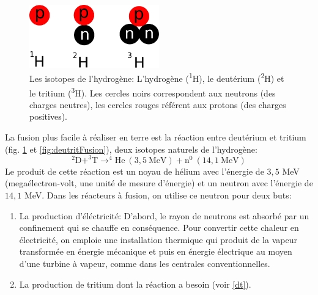 \documentclass[12pt,a4paper]{article}
\begin{document}
\begin{figure}[htb]
	\centering \includegraphics[width=0.5\textwidth]{images/IsotopesH}
	\caption{Les isotopes de l'hydrogène: L'hydrogène (\textsuperscript{1}H), le deutérium (\textsuperscript{2}H) et le tritium (\textsuperscript{3}H). Les cercles noirs correspondent aux neutrons (des charges neutres), les cercles rouges référent aux protons (des charges positives).}
	\label{fig:deutrit}
\end{figure}
La fusion plus facile à réaliser en terre est la réaction entre deutérium et tritium (fig. \ref{fig:deutrit} et \ref{fig:deutritFusion}), deux isotopes naturels de l'hydrogène:
\begin{equation}
^2 \text{D} + ^3 \text{T} \rightarrow ^4\text{He} ~( 3,5 ~\text{MeV} ) + \text{n}^0 ~( 14,1 ~\text{MeV} ) \label{eqn:DTfusion}
\end{equation}
Le produit de cette réaction est un noyau de hélium avec l'énergie de $3,5$ MeV (megaélectron-volt, une unité de mesure d'énergie) et un neutron avec l'énergie de $14,1$ MeV. Dans les réacteurs à fusion, on utilise ce neutron pour deux buts:
\begin{enumerate}
\item La production d'éléctricité: D'abord, le rayon de neutrons est absorbé par un confinement qui se chauffe en conséquence. Pour convertir cette chaleur en électricité, on emploie une installation thermique qui produit de la vapeur transformée en énergie mécanique et puis en énergie électrique au moyen d'une turbine à vapeur, comme dans les centrales conventionnelles. 
\item La production de tritium dont la réaction a besoin (voir \ref{dt}).
\end{enumerate}
\end{document}
